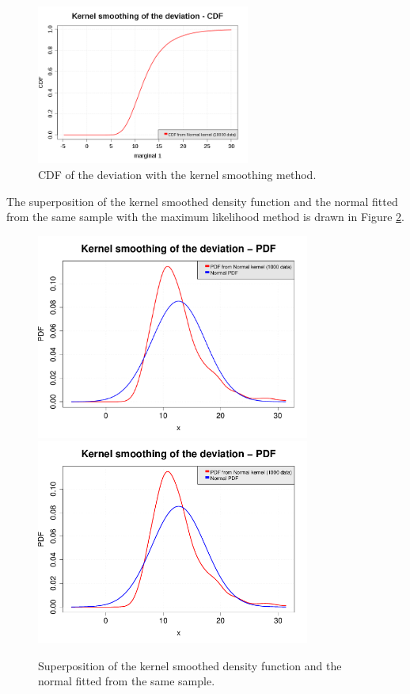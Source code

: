 \documentclass[11pt]{article}
\begin{document}
\begin{figure}[Hhbtp]
\begin{minipage}{9.8cm}
\begin{center}
      \else
      \includegraphics[width=7cm]{smoothedCDF.png}
      \fi
      \caption{CDF of the deviation with the kernel smoothing method.}
      \label{KernelSmoothing2}
    \end{center}
  \end{minipage}
\end{figure}


The superposition of the kernel smoothed density function and the normal fitted from the same sample with the maximum likelihood method is drawn in Figure \ref{superp}.


\begin{figure}[Hhbtp]
  \begin{center}
    \ifpdf
    \includegraphics[width=9cm]{smoothedPDF_and_GaussianPDF.pdf}
    \else
    \includegraphics[width=9cm]{smoothedPDF_and_GaussianPDF.png}
    \fi
  \end{center}
  \caption{Superposition of the kernel smoothed density function and the normal fitted from the same sample.}
  \label{superp}
\end{figure}
\end{document}
